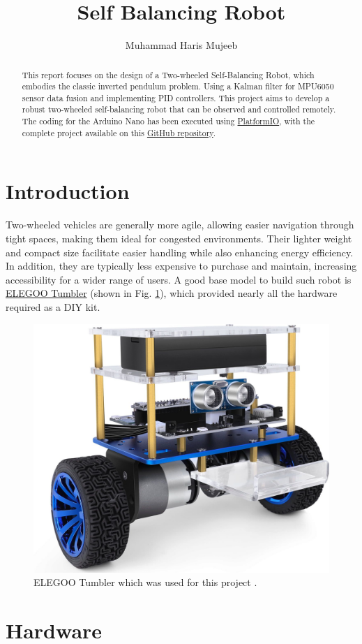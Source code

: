 \documentclass{article}
\title{Self Balancing Robot}
\author{Muhammad Haris Mujeeb}
\begin{document}
\maketitle

\begin{abstract}
This report focuses on the design of a Two-wheeled Self-Balancing Robot, which embodies the classic inverted pendulum problem. Using a Kalman filter for MPU6050 sensor data fusion and implementing PID controllers. This project aims to develop a robust two-wheeled self-balancing robot that can be observed and controlled remotely. The coding for the Arduino Nano has been executed using \href{https://platformio.org/}{PlatformIO}, with the complete project available on this \href{https://github.com/haris-mujeeb/Self-Balancing-Robot}{GitHub repository}.
\end{abstract}

\section{Introduction}
Two-wheeled vehicles are generally more agile, allowing easier navigation through tight spaces, making them ideal for congested environments. Their lighter weight and compact size facilitate easier handling while also enhancing energy efficiency. In addition, they are typically less expensive to purchase and maintain, increasing accessibility for a wider range of users.
A good base model to build such robot is \href{https://www.elegoo.com/products/elegoo-tumbller-self-balancing-robot-car}{ELEGOO Tumbler} (shown in Fig. \ref{fig:tumbler}), which provided nearly all the hardware required as a DIY kit.

\begin{figure}[h]
    \centering
    \includegraphics[width=0.25\linewidth]{assets/tumbler.jpg}
    \caption{\label{fig:tumbler} ELEGOO Tumbler which was used for this project \cite{elegoo}.}
\end{figure}

\section{Hardware}
\end{document}
